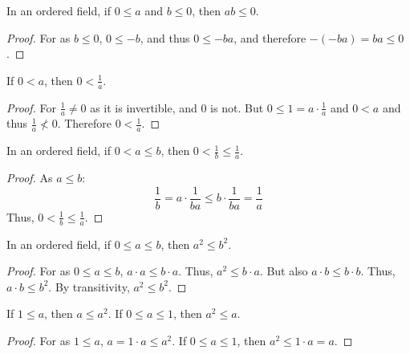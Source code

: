     \begin{theorem}
        In an ordered field, if $0\leq a$ and $b\leq 0$, then $ab\leq 0$.
    \end{theorem}
    \begin{proof}
        For as $b\leq 0$, $0\leq -b$, and thus $0\leq -ba$, and therefore
        $-(-ba) = ba \leq 0$.
    \end{proof}
    \begin{theorem}
        If $0< a$, then $0<\frac{1}{a}$.
    \end{theorem}
    \begin{proof}
        For $\frac{1}{a}\ne 0$ as it is invertible, and $0$ is not. But
        $0\leq1=a\cdot \frac{1}{a}$ and $0<a$ and thus $\frac{1}{a} \not <0$.
        Therefore $0<\frac{1}{a}$.
    \end{proof}
    \begin{theorem}
        In an ordered field, if $0<a\leq b$, then
        $0<\frac{1}{b}\leq\frac{1}{a}$.
    \end{theorem}
    \begin{proof}
        As $a\leq b$:
        \begin{equation}
            \frac{1}{b}
            =a\cdot\frac{1}{ba}\leq{b}\cdot\frac{1}{ba}
            =\frac{1}{a}
        \end{equation}
        Thus, $0< \frac{1}{b}\leq \frac{1}{a}$.
    \end{proof}
    \begin{theorem}
        In an ordered field, if $0 \leq a \leq b$, then $a^2 \leq b^2$.
    \end{theorem}
    \begin{proof}
        For as $0\leq{a}\leq{b}$, $a\cdot{a}\leq{b}\cdot{a}$. Thus,
        $a^{2}\leq{b}\cdot{a}$. But also $a\cdot{b}\leq{b}\cdot{b}$. Thus,
        $a\cdot{b}\leq{b}^{2}$. By transitivity, $a^{2}\leq{b}^{2}$.
    \end{proof}
    \begin{theorem}
        If $1\leq a$, then $a \leq a^2$. If $0\leq a \leq 1$, then
        $a^2 \leq a$.
    \end{theorem}
    \begin{proof}
        For as $1\leq a$, $a=1\cdot a \leq a^2$. If $0\leq a \leq 1$, then
        $a^2 \leq 1\cdot a = a$.
    \end{proof}